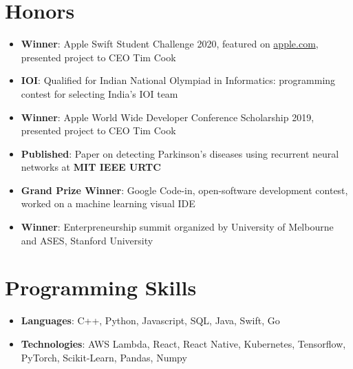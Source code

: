 \documentclass[letterpaper,11pt]{article}
\newcommand{\resumeItem}[2]{
  \item\small{
    \textbf{#1}{: #2 \vspace{-2pt}}
  }
}
\newcommand{\resumeSubItem}[2]{\resumeItem{#1}{#2}\vspace{-4pt}}
\newcommand{\resumeSubHeadingListStart}{\begin{itemize}[leftmargin=*]}
\newcommand{\resumeSubHeadingListEnd}{\end{itemize}}
\begin{document}
%

\section{Honors}
  \resumeSubHeadingListStart
    \resumeSubItem{Winner}{Apple Swift Student Challenge 2020, featured on \href{https://www.apple.com/newsroom/2020/06/apples-wwdc20-swift-student-challenge-winners-determined-to-shape-the-future/}{apple.com}, presented project to CEO Tim Cook}
    \resumeSubItem{IOI}{Qualified for Indian National Olympiad in Informatics: programming contest for selecting India's IOI team}
    \resumeSubItem{Winner}{Apple World Wide Developer Conference Scholarship 2019, presented project to CEO Tim Cook}
    \resumeSubItem{Published}{Paper on detecting Parkinson's diseases using recurrent neural networks at {\bf MIT IEEE URTC}}
    \resumeSubItem{Grand Prize Winner}{Google Code-in, open-software development contest, worked on a machine learning visual IDE}
    \resumeSubItem{Winner}{Enterpreneurship summit organized by University of Melbourne and ASES, Stanford University}
  \resumeSubHeadingListEnd


\section{Programming Skills}
 \resumeSubHeadingListStart
  \resumeSubItem{Languages}{C++, Python, Javascript, SQL, Java, Swift, Go}
  \resumeSubItem{Technologies}{AWS Lambda, React, React Native, Kubernetes, Tensorflow, PyTorch, Scikit-Learn, Pandas, Numpy}
 \resumeSubHeadingListEnd


\end{document}

